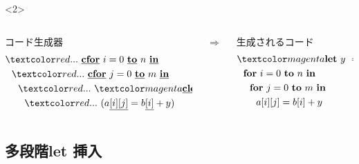 \begin{frame}
  \begin{onlyenv}<2>
    \begin{columns}
      \begin{column}{0.5\textwidth}%
        コード生成器
        \begin{align*}
          & \red{...}~ \cforin{i = 0}{n} \\
          & ~~\red{...}~ \cforin{j = 0}{m} \\
          & ~~~~\red{...}~ \magenta{\cLet~y=t~\cIn} \\
          & ~~~~~~\red{...}~ (a\cArrays{i}{j} = b\cArray{i} + y)
        \end{align*}
      \end{column}
      $\Rightarrow$
      \begin{column}{0.5\textwidth}%
        生成されるコード
        \begin{align*}
          & \magenta{\Let ~y ~= ~t ~\In} \\
          & ~~\forin{i = 0}{n} \\
          & ~~~~\forin{j = 0}{m} \\
          & ~~~~~~a[i][j] = b[i] + y \\
        \end{align*}
      \end{column}
    \end{columns}
  \end{onlyenv}
\end{frame}



\subsection{多段階let 挿入}

